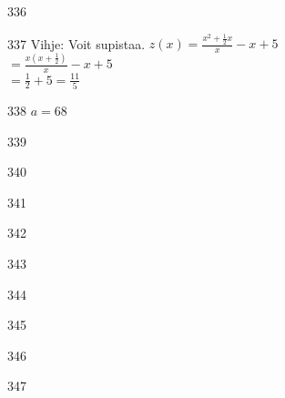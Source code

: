 \begin{Vastaus}{336}
	
\end{Vastaus}
\begin{Vastaus}{337}
	Vihje: Voit supistaa. $z(x) = \frac{x^2+\frac{1}{2}x}{x}-x+5$ \\ $= \frac{x(x+\frac{1}{2})}{x}-x+5$ \\ $= \frac{1}{2}+5 = \frac{11}{5}$
  
\end{Vastaus}
\begin{Vastaus}{338}
$a=68$
	
\end{Vastaus}
\begin{Vastaus}{339}
	
\end{Vastaus}
\begin{Vastaus}{340}
    
\end{Vastaus}
\begin{Vastaus}{341}
    
\end{Vastaus}
\begin{Vastaus}{342}
	
\end{Vastaus}
\begin{Vastaus}{343}
    
\end{Vastaus}
\begin{Vastaus}{344}
  
\end{Vastaus}
\begin{Vastaus}{345}
\end{Vastaus}
\begin{Vastaus}{346}
\end{Vastaus}
\begin{Vastaus}{347}
\end{Vastaus}
